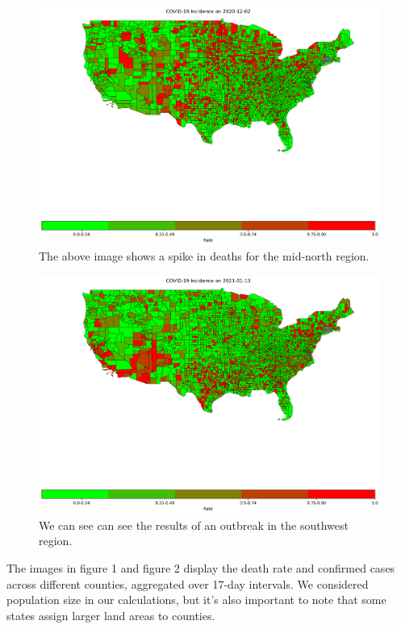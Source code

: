 \documentclass[sigconf,screen,nonacm]{acmart}
\begin{document}
\begin{figure}[h]
  \centering
  \includegraphics[width=1\linewidth]{Figures/IncidenceDeathRate_2020-12-02.png}
  \caption{The above image shows a spike in deaths for the mid-north region.}
\end{figure}



\begin{figure}[H]
  \centering
  \includegraphics[width=1\linewidth]{Figures/IncidenceDeathRate_2021-01-13.png}
  
  \caption{We can see can see the results of an outbreak in the southwest region.}
\end{figure}
\noindent
The images in figure 1 and figure 2 display the death rate and confirmed cases across different counties, aggregated over 17-day intervals. We considered population size in our calculations, but it's also important to note that some states assign larger land areas to counties.
\end{document}
